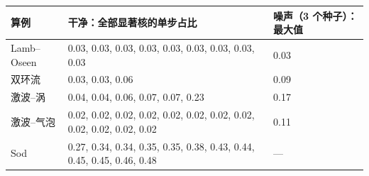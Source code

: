 \begin{tabular}{lll}\toprule 算例 & 干净：全部显著核的单步占比 & 噪声（3 个种子）：最大值\\\midrule
Lamb–Oseen & 0.03, 0.03, 0.03, 0.03, 0.03, 0.03, 0.03, 0.03, 0.03 & 0.03\\
双环流 & 0.03, 0.03, 0.06 & 0.09\\
激波–涡 & 0.04, 0.04, 0.06, 0.07, 0.07, 0.23 & 0.17\\
激波–气泡 & 0.02, 0.02, 0.02, 0.02, 0.02, 0.02, 0.02, 0.02, 0.02, 0.02, 0.02, 0.02 & 0.11\\
Sod & 0.27, 0.34, 0.34, 0.35, 0.35, 0.38, 0.43, 0.44, 0.45, 0.45, 0.46, 0.48 & —\\
\bottomrule\end{tabular}